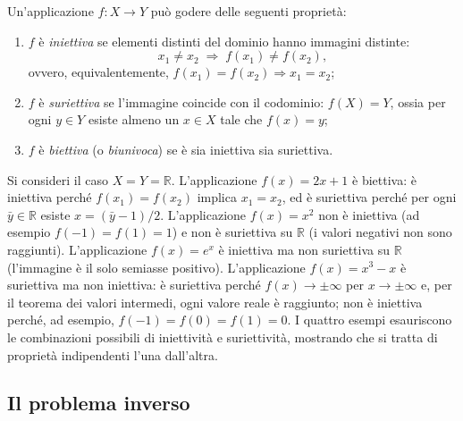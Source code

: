Un'applicazione $f: X \to Y$ pu\`o godere delle seguenti propriet\`a:
\begin{enumerate}[label=(\roman*)]
	\item $f$ \`e \textit{iniettiva} se elementi distinti del dominio hanno immagini distinte:
	\begin{equation}
		x_1 \neq x_2 \;\Longrightarrow\; f(x_1) \neq f(x_2),
	\end{equation}
	ovvero, equivalentemente, $f(x_1)=f(x_2) \Rightarrow x_1=x_2$;
	\item $f$ \`e \textit{suriettiva} se l'immagine coincide con il codominio: $f(X) = Y$, ossia per ogni $y \in Y$ esiste almeno un $x \in X$ tale che $f(x)=y$;
	\item $f$ \`e \textit{biettiva} (o \textit{biunivoca}) se \`e sia iniettiva sia suriettiva.
\end{enumerate}

\begin{esempio}
	Si consideri il caso $X = Y = \mathbb{R}$.
	L'applicazione $f(x) = 2x+1$ \`e biettiva: \`e iniettiva perch\'e $f(x_1)=f(x_2)$ implica $x_1=x_2$, ed \`e suriettiva perch\'e per ogni $\bar{y} \in \mathbb{R}$ esiste $x=(\bar{y}-1)/2$.
	L'applicazione $f(x) = x^2$ non \`e iniettiva (ad esempio $f(-1)=f(1)=1$) e non \`e suriettiva su $\mathbb{R}$ (i valori negativi non sono raggiunti).
	L'applicazione $f(x) = e^x$ \`e iniettiva ma non suriettiva su $\mathbb{R}$ (l'immagine \`e il solo semiasse positivo).
	L'applicazione $f(x) = x^3-x$ \`e suriettiva ma non iniettiva: \`e suriettiva perch\'e $f(x)\to\pm\infty$ per $x\to\pm\infty$ e, per il teorema dei valori intermedi, ogni valore reale \`e raggiunto; non \`e iniettiva perch\'e, ad esempio, $f(-1)=f(0)=f(1)=0$. I quattro esempi esauriscono le combinazioni possibili di iniettivit\`a e suriettivit\`a, mostrando che si tratta di propriet\`a indipendenti l'una dall'altra.
\end{esempio}


\subsection{Il problema inverso}\label{par:problema_inverso}

